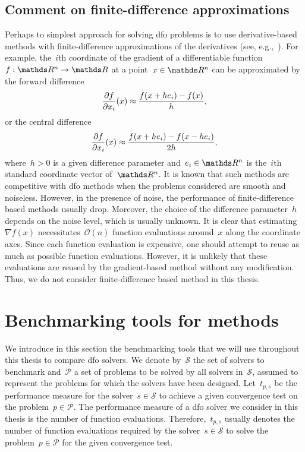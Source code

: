 \subsection{Comment on finite-difference approximations}
\label{subsec:finite-difference}

Perhaps to simplest approach for solving \gls{dfo} problems is to use derivative-based methods with finite-difference approximations of the derivatives (see, e.g.,~\cite{Shi_Etal_2021}).
For example, the~$i$th coordinate of the gradient of a differentiable function~$\obj : \R^n \to \R$ at a point~$x \in \R^n$ can be approximated by the forward difference
\begin{equation*}
    \frac{\partial f}{\partial x_i}(x) \approx \frac{f(x + h e_i) - f(x)}{h},
\end{equation*}
or the central difference
\begin{equation*}
    \frac{\partial f}{\partial x_i}(x) \approx \frac{f(x + h e_i) - f(x - h e_i)}{2h},
\end{equation*}
where~$h > 0$ is a given difference parameter and~$e_i \in \R^n$ is the~$i$th standard coordinate vector of~$\R^n$.
It is known that such methods are competitive with \gls{dfo} methods when the problems considered are smooth and noiseless.
However, in the presence of noise, the performance of finite-difference based methods usually drop.
Moreover, the choice of the difference parameter~$h$ depends on the noise level, which is usually unknown.
It is clear that estimating~$\nabla f(x)$ necessitates~$\mathcal{O}(n)$ function evaluations around~$x$ along the coordinate axes.
Since each function evaluation is expensive, one should attempt to reuse as much as possible function evaluations.
However, it is unlikely that these evaluations are reused by the gradient-based method without any modification.
Thus, we do not consider finite-difference based method in this thesis.

\section{Benchmarking tools for  methods}

We introduce in this section the benchmarking tools that we will use throughout this thesis to compare \gls{dfo} solvers.
We denote by~$\mathcal{S}$ the set of solvers to benchmark and~$\mathcal{P}$ a set of problems to be solved by all solvers in~$\mathcal{S}$, assumed to represent the problems for which the solvers have been designed.
Let~$t_{p, s}$ be the performance measure for the solver~$s \in \mathcal{S}$ to achieve a given convergence test on the problem~$p \in \mathcal{P}$.
The performance measure of a \gls{dfo} solver we consider in this thesis is the number of function evaluations.
Therefore,~$t_{p, s}$ usually denotes the number of function evaluations required by the solver~$s \in \mathcal{S}$ to solve the problem~$p \in \mathcal{P}$ for the given convergence test.

